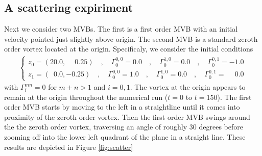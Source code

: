 \documentclass[12pt]{amsart}
\theoremstyle{remark}
\begin{document}
\subsection{A scattering expiriment}
\label{sec:scattering}
Next we consider two MVBs.  The first is a first order MVB with an initial velocity pointed just slightly above origin.
The second MVB is a standard zeroth order vortex located at the origin.
Specificaly, we consider the initial conditions
\begin{align}
	\begin{cases}
	z_0 = (20.0 , \phantom{-}0.25)\quad, \quad \Gamma_0^{0,0} = 0.0 \quad,\quad \Gamma_0^{1,0} = 0.0 \quad,\quad \Gamma_0^{0,1} = -1.0 \\
	z_1 = (\phantom{2}0.0 , -0.25)\quad, \quad \Gamma_0^{0,0} = 1.0 \quad,\quad \Gamma_0^{1,0} = 0.0 \quad,\quad \Gamma_0^{0,1} = \phantom{-}0.0
	\end{cases}
	\label{eq:ic}
\end{align}
with $\Gamma_i^{mn} = 0$ for $m+n > 1$ and $i=0,1$.
The vortex at the origin appears to remain at the origin throughout the numerical run ($t=0$ to $t=150$).
The first order MVB starts by moving to the left in a straightline until it comes into proximity of the zeroth order vortex.
Then the first order MVB swings around the the zeroth order vortex, traversing an angle of roughly 30 degrees
before zooming off into the lower left quadrant of the plane in a straight line.  These results are depicted in Figure \ref{fig:scatter}
\end{document}

